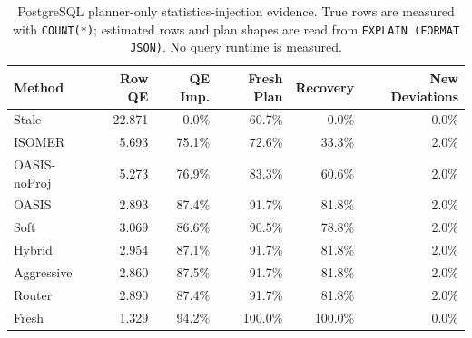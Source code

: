 \begin{table}[t]
  \centering
  \small
  \caption{PostgreSQL planner-only statistics-injection evidence. True rows are measured with \texttt{COUNT(*)}; estimated rows and plan shapes are read from \texttt{EXPLAIN (FORMAT JSON)}. No query runtime is measured.}
  \label{tab:postgres_planner_stats_injection}
  \setlength{\tabcolsep}{4pt}
  \begin{tabular}{lrrrrr}
    \toprule
    Method & Row QE & QE Imp. & Fresh Plan & Recovery & New Deviations \\
    \midrule
    Stale & 22.871 & 0.0\% & 60.7\% & 0.0\% & 0.0\% \\
    ISOMER & 5.693 & 75.1\% & 72.6\% & 33.3\% & 2.0\% \\
    OASIS-noProj & 5.273 & 76.9\% & 83.3\% & 60.6\% & 2.0\% \\
    OASIS & 2.893 & 87.4\% & 91.7\% & 81.8\% & 2.0\% \\
    Soft & 3.069 & 86.6\% & 90.5\% & 78.8\% & 2.0\% \\
    Hybrid & 2.954 & 87.1\% & 91.7\% & 81.8\% & 2.0\% \\
    Aggressive & 2.860 & 87.5\% & 91.7\% & 81.8\% & 2.0\% \\
    Router & 2.890 & 87.4\% & 91.7\% & 81.8\% & 2.0\% \\
    Fresh & 1.329 & 94.2\% & 100.0\% & 100.0\% & 0.0\% \\
    \bottomrule
  \end{tabular}
\end{table}
